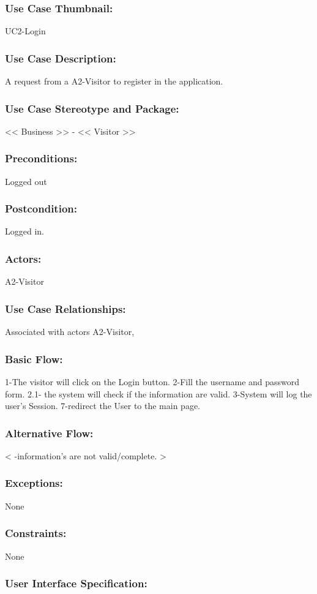 \documentclass[11pt, openany]{report}
\begin{document}
\subsubsection{Use Case Thumbnail:}
UC2-Login
\subsubsection{Use Case Description:}
A request from a A2-Visitor to register in the application.
\subsubsection{Use Case Stereotype and Package:}
<< Business >> - << Visitor >>
\subsubsection{Preconditions:}
Logged out
\subsubsection{Postcondition:}
Logged in.
\subsubsection{Actors:}
A2-Visitor
\subsubsection{Use Case Relationships:}
Associated with actors A2-Visitor,
\subsubsection{Basic Flow:}
1-The visitor will click on the Login button.
2-Fill the username and password form.
  2.1- the system will check if the information are valid.
3-System will log the user's Session.
7-redirect the User to the main page.
\subsubsection{Alternative Flow:}
< -information's are not valid/complete. >
\subsubsection{Exceptions:}
None
\subsubsection{Constraints:}
None
\subsubsection{User Interface Specification:}
\end{document}
